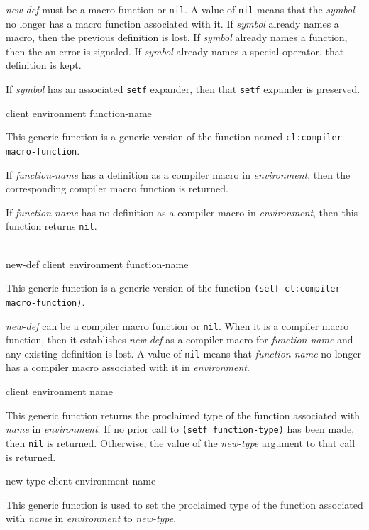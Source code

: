 \textit{new-def} must be a macro function or \texttt{nil}.  A value of
\texttt{nil} means that the \textit{symbol} no longer has a macro
function associated with it.  If \textit{symbol} already names a
macro, then the previous definition is lost.  If \textit{symbol}
already names a function, then the an error is signaled.  If
\textit{symbol} already names a special operator, that definition is
kept.

If \textit{symbol} has an associated \texttt{setf} expander, then that
\texttt{setf} expander is preserved.

 {client environment function-name}

This generic function is a generic version of the \commonlisp{}
function named \texttt{cl:compiler-macro-function}.

If \textit{function-name} has a definition as a compiler macro in
\textit{environment}, then the corresponding compiler macro function
is returned.

If \textit{function-name} has no definition as a compiler macro in
\textit{environment}, then this function returns \texttt{nil}.

\\
{new-def client environment function-name}

This generic function is a generic version of the \commonlisp{}
function \texttt{(setf cl:compiler-macro-function)}.

\textit{new-def} can be a compiler macro function or \texttt{nil}.
When it is a compiler macro function, then it establishes
\textit{new-def} as a compiler macro for \textit{function-name} and
any existing definition is lost.  A value of \texttt{nil} means that
\textit{function-name} no longer has a compiler macro associated with
it in \textit{environment}.

 {client environment name}

This generic function returns the proclaimed type of the function
associated with \textit{name} in \textit{environment}.  If no
prior call to \texttt{(setf function-type)} has been made, then
\texttt{nil} is returned.  Otherwise, the value of the
\textit{new-type} argument to that call is returned.

 {new-type client environment name}

This generic function is used to set the proclaimed type of the
function associated with \textit{name} in
\textit{environment} to \textit{new-type}.

